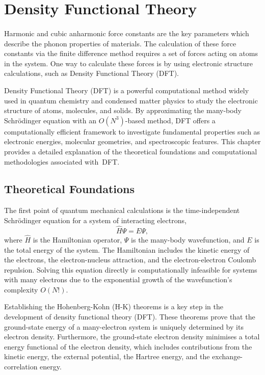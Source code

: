 \section{Density Functional Theory} \label{sec:2.2}
\paragraph{}
Harmonic and cubic anharmonic force constants are the key parameters which describe the phonon properties of materials.
The calculation of these force constants via the finite difference method requires a set of forces acting on atoms in the system.
One way to calculate these forces is by using electronic structure calculations, such as Density Functional Theory (DFT).

Density Functional Theory (DFT) is a powerful computational method widely used in quantum chemistry and condensed matter physics to study the electronic structure of atoms, molecules, and solids.
By approximating the many-body Schrödinger equation with an $O(N^{3})$-based method, DFT offers a computationally efficient framework to investigate fundamental properties such as electronic energies, molecular geometries, and spectroscopic features.
This chapter provides a detailed explanation of the theoretical foundations and computational methodologies associated with~DFT.

\subsection{Theoretical Foundations}  \label{sec:2.2.1}
The first point of quantum mechanical calculations is the time-independent Schr\"{o}dinger equation for a system of interacting electrons,
\[
    \hat{H} \Psi = E \Psi,
\]
where $\hat{H}$ is the Hamiltonian operator, $\Psi$ is the many-body wavefunction, and $E$ is the total energy of the system.
The Hamiltonian includes the kinetic energy of the electrons, the electron-nucleus attraction, and the electron-electron Coulomb repulsion.
Solving this equation directly is computationally infeasible for systems with many electrons due to the exponential growth of the wavefunction's complexity $O(N!)$.

Establishing the Hohenberg-Kohn (H-K) theorems is a key step in the development of density functional theory (DFT).
These theorems prove that the ground-state energy of a many-electron system is uniquely determined by its electron density. 
Furthermore, the ground-state electron density minimises a total energy functional of the electron density, which includes contributions from the kinetic energy, the external potential, the Hartree energy, and the exchange-correlation energy.

